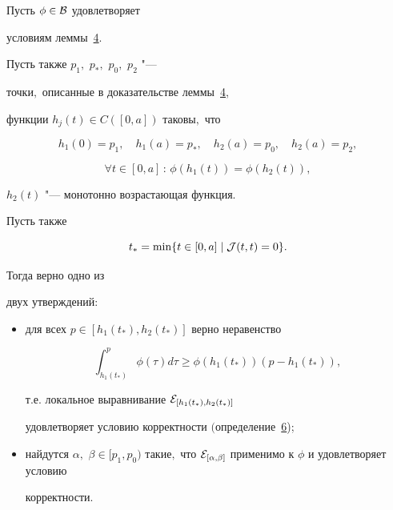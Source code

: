 \begin{lemma}[7 (об альтернативе)]Пусть $\phi\in{\cal B}$ удовлетворяет 

условиям леммы~{\rm\hyperlink{palin:lemma4}{4}.}

Пусть также $p_1,$ $p_*,$ $p_0,$ $p_2$ "---

точки$,$ описанные в доказательстве леммы~{\rm\hyperlink{palin:lemma4}{4},}

функции $h_j(t)\in C([0,a])$ таковы$,$ что

$$

h_1(0)=p_1,\quad h_1(a)=p_*,\quad h_2(a)=p_0,\quad h_2(a)=p_2,

$$

$$

\forall t\in[0,a]\,:\,\phi(h_1(t))=\phi(h_2(t)),

$$

$h_2(t)$ "--- монотонно возрастающая функция$.$ 

Пусть также

$$t_*=\min\{t\in[0,a]\mid{\cal J}(t,t)=0\}.$$ 



Тогда верно одно из

двух утверждений\/{\rm:}

\begin{itemize}

\item[\rm (а)] \hypertarget{7a}{} для всех $p\in[h_1(t_*),h_2(t_*)]$ верно неравенство

$$\int _{h_1(t_*)}^p\phi(\tau)d\tau\ge\phi(h_1(t_*))(p-h_1(t_*)),$$

т$.$е$.$ локальное выравнивание ${\cal E}_{[h_1(t_*),h_2(t_*)]}$

удовлетворяет условию корректности $($определение~{\rm \hyperlink{palin:definition6}{6});} 

\item[\rm (б)] \hypertarget{7b}{} найдутся $\alpha,$ $\beta\in[p_1,p_0)$ такие$,$ что ${\cal E}_{[\alpha,\beta]}$ применимо к $\phi$ и удовлетворяет условию

корректности\rm.



\end{itemize}



\end{lemma}

